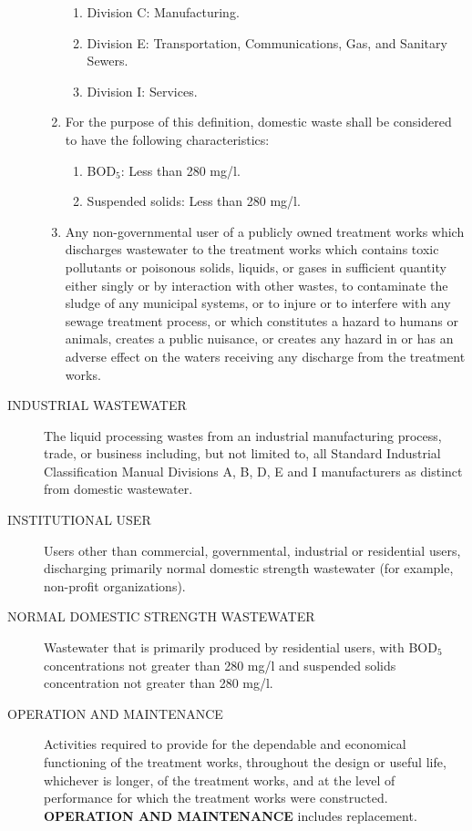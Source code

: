 \begin{description}
\begin{enumerate}
\begin{enumerate}[{\indent}a)]
        \item Division C:  Manufacturing.
        \item Division E:  Transportation, Communications, Gas, and Sanitary Sewers.
        \item Division I:  Services.
    \end{enumerate}
\item For the purpose of this definition, domestic waste shall be considered to have the following characteristics:
    \begin{enumerate}[{\indent}a)]
        \item BOD$_{5}$: Less than 280 mg/l.
        \item Suspended solids:  Less than 280 mg/l.
    \end{enumerate}
\item Any non-governmental user of a publicly owned treatment works which discharges wastewater to the treatment works which contains toxic pollutants or poisonous solids, liquids, or gases in sufficient quantity either singly or by interaction with other wastes, to contaminate the sludge of any municipal systems, or to injure or to interfere with any sewage treatment process, or which constitutes a hazard to humans or animals, creates a public nuisance, or creates any hazard in or has an adverse effect on the waters receiving any discharge from the treatment works.
\end{enumerate}
\item[INDUSTRIAL WASTEWATER] The liquid processing wastes from an industrial manufacturing process, trade, or business including, but not limited to, all Standard Industrial Classification Manual Divisions A, B, D, E and I manufacturers as distinct from domestic wastewater.
\item[INSTITUTIONAL USER] Users other than commercial, governmental, industrial or residential users, discharging primarily normal domestic strength wastewater (for example, non-profit organizations).
\item[NORMAL DOMESTIC STRENGTH WASTEWATER] Wastewater that is primarily produced by residential users, with BOD$_{5}$ concentrations not greater than 280 mg/l and suspended solids concentration not greater than 280 mg/l.
\item[OPERATION AND MAINTENANCE] Activities required to provide for the dependable and economical functioning of the treatment works, throughout the design or useful life, whichever is longer, of the treatment works, and at the level of performance for which the treatment works were constructed.  \textbf{OPERATION AND MAINTENANCE} includes replacement.

\end{description}
